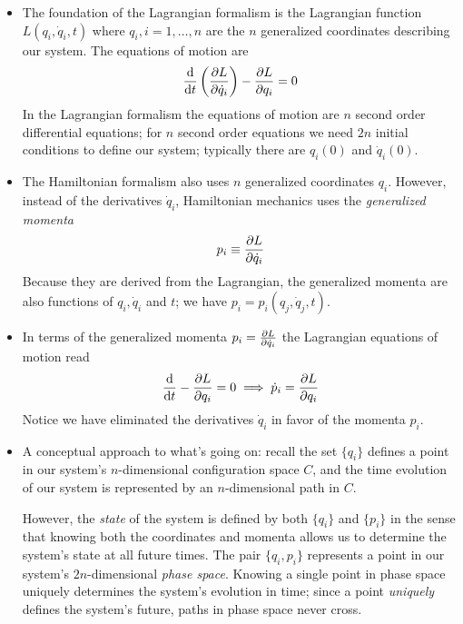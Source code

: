 \documentclass[11pt, a4paper]{article}
\begin{document}
\begin{itemize}
	\item The foundation of the Lagrangian formalism is the Lagrangian function $ L(q_{i}, \dot{q}_{i}, t) $ where $ q_{i},  i = 1, \dots, n $ are the $ n $ generalized coordinates describing our system. The equations of motion are
	\begin{equation*}
		\dv{}{t}\left(\pdv{L}{\dot{q}_{i}}\right) - \pdv{L}{q_{i}} = 0
	\end{equation*}
	In the Lagrangian formalism the equations of motion are $ n $ second order differential equations; for $ n $ second order equations we need $ 2n $ initial conditions to define our system; typically there are $ q_{i}(0) $ and $ \dot{q}_{i}(0) $. 
	
	\item The Hamiltonian formalism also uses $ n $ generalized coordinates $ q_{i} $. However, instead of the derivatives $ \dot{q}_{i} $, Hamiltonian mechanics uses the \textit{generalized momenta} 
	\begin{equation*}
		p_{i} \equiv \pdv{L}{\dot{q}_{i}}
	\end{equation*}
	Because they are derived from the Lagrangian, the generalized momenta are also functions of $ q_{i}, \dot{q}_{i} $ and $ t $; we have $ p_{i} = p_{i}(q_{j}, \dot{q}_{j}, t) $. 
	
	\item In terms of the generalized momenta $ p_{i} = \pdv{L}{\dot{q}_{i}} $ the Lagrangian equations of motion read
	\begin{equation*}
		\dv{}{t}(p_{i}) - \pdv{L}{q_{i}} = 0 \implies \dot{p}_{i} = \pdv{L}{q_{i}}
	\end{equation*}
	Notice we have eliminated the derivatives $ \dot{q}_{i} $ in favor of the momenta $ p_{i} $.
	
	\item A conceptual approach to what's going on: recall the set $ \{q_{i}\} $ defines a point in our system's $ n $-dimensional configuration space $ C $, and the time evolution of our system is represented by an $ n $-dimensional path in $ C $.
	
	However, the \textit{state} of the system is defined by both $ \{q_{i}\} $ and $ \{p_{i}\} $ in the sense that knowing both the coordinates and momenta allows us to determine the system's state at all future times. The pair $ \{q_{i}, p_{i} \} $ represents a point in our system's $ 2n $-dimensional \textit{phase space}. Knowing a single point in phase space  uniquely determines the system's evolution in time; since a point \textit{uniquely} defines the system's future, paths in phase space never cross.
\end{itemize}
\end{document}

